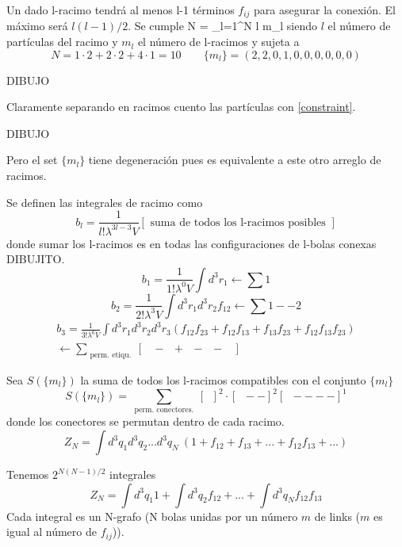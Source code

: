 \documentclass[10pt,oneside]{CBFT_book}
\begin{document}
Un dado l-racimo tendrá al menos l-1 términos $f_{ij}$ para asegurar la conexión. El máximo será $l(l-1)/2$.
Se cumple 
\be
	N = \sum_{l=1}^N  \; l \cdot m_l \quad {}
	\label{constraint}
\ee
siendo $l$ el número de partículas del racimo y $m_l$ el número de l-racimos y sujeta a
\[
	N = 1 \cdot 2 + 2 \cdot 2 + 4 \cdot 1 = 10 \qquad  \{ m_l \} = ( 2,2,0,1,0,0,0,0,0,0 )
\]

DIBUJO 

Claramente separando en racimos cuento las partículas con \eqref{constraint}.

DIBUJO 

Pero el set $ \{ m_l \} $ tiene degeneración pues es equivalente a este otro arreglo de racimos.

Se definen las integrales de racimo como 
\[
	b_l = \frac{1}{l! \lambda^{3l-3} V} \left[ \text{ suma de todos los l-racimos posibles }\right]
\]
donde sumar los l-racimos es en todas las configuraciones de l-bolas conexas DIBUJITO.
\[
	b_1 = \frac{1}{1! \lambda^0 V} \int d^3r_1 \leftarrow \sum \boxed{1}
\]
\[
	b_2 = \frac{1}{2! \lambda^3 V} \int d^3r_1 d^3r_2  f_{12} \leftarrow \sum \boxed{1} -- \boxed{2}
\]
\begin{multline*}
	b_3 = \frac{1}{3! \lambda^6 V} \int d^3r_1 d^3r_2 d^3r_3 (f_{12}f_{23} + f_{12}f_{13} + f_{13}f_{23}+
	f_{12}f_{13}f_{23} ) \\
	\leftarrow \sum_{\text{ perm. etiqu. }} \left[ \; \boxed{\phantom{a}}-\boxed{\phantom{a}} + 
	\boxed{\phantom{a}}-\boxed{\phantom{a}}-\boxed{\phantom{a}} \; \right]
\end{multline*}

Sea $ S( \{ m_l \} ) $ la suma de todos los l-racimos compatibles con el conjunto $ \{ m_l \}$
\[
	S( \{ m_l \} ) = \sum_{\text{ perm. conectores. }} \left[ \boxed{ \phantom{a} } \right]^2 \cdot 
	\left[ \boxed{ \phantom{a} }-- \right]^2 \left[ \boxed{ \phantom{a} } ---- \right]^1
\]
donde los conectores se permutan dentro de cada racimo.
\[
	Z_N = \int d^3q_1 d^3q_2 ... d^3q_N \: ( 1 + f_{12} + f_{13} + ... + f_{12}f_{13} + ... )
\]

Tenemos $ 2^{N(N-1)/2} $ integrales
\[
	Z_N = \int d^3q_1 1 + \int d^3q_2 f_{12} + ... + \int d^3q_N f_{12}f_{13} 
\]
Cada integral es un N-grafo (N bolas unidas por un número $m$ de links ($m$ es igual al número de $f_{ij}$)).
\end{document}
